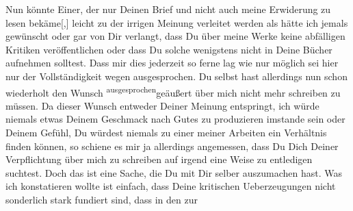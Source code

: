 \pstart
           Nun könnte Einer, der nur Deinen Brief und nicht {\pb}auch meine Erwiderung zu lesen
                  bekäme{[},{]} leicht zu der irrigen Meinung verleitet werden als
               hätte ich jemals gewünscht oder gar von Dir verlangt, dass Du über meine Werke keine
               abfälligen Kritiken \introOben{}veröffentlichen\introOben{} oder dass Du solche
               wenigstens nicht in Deine Bücher aufnehmen solltest. Dass mir
               dies jederzeit so ferne lag wie nur möglich sei hier nur der Vollständigkeit wegen
               ausgesprochen. Du selbst hast allerdings nun schon wiederholt den Wunsch \substVorne{}\textsuperscript{ausgesprochen}\substDazwischen{}geäußert\substHinten{} über mich nicht mehr schreiben zu müssen. Da dieser Wunsch entweder Deiner
               Meinung entspringt, ich würde niemals etwas Deinem Geschmack nach Gutes zu
               produzieren imstande sein oder Deinem Gefühl, Du würdest niemals zu einer meiner
               Arbeiten ein Verhältnis finden können, so schiene es mir ja allerdings angemessen,
               dass Du Dich Deiner Verpflichtung über mich zu schreiben \introOben{}auf
                  irgend eine Weise\introOben{} zu entledigen suchtest. Doch das ist eine Sache, die Du
               mit Dir selber auszumachen hast. Was ich konstatieren wollte ist einfach, dass Deine
               kritischen Ueberzeugungen nicht sonderlich stark fundiert sind, dass in den zur
